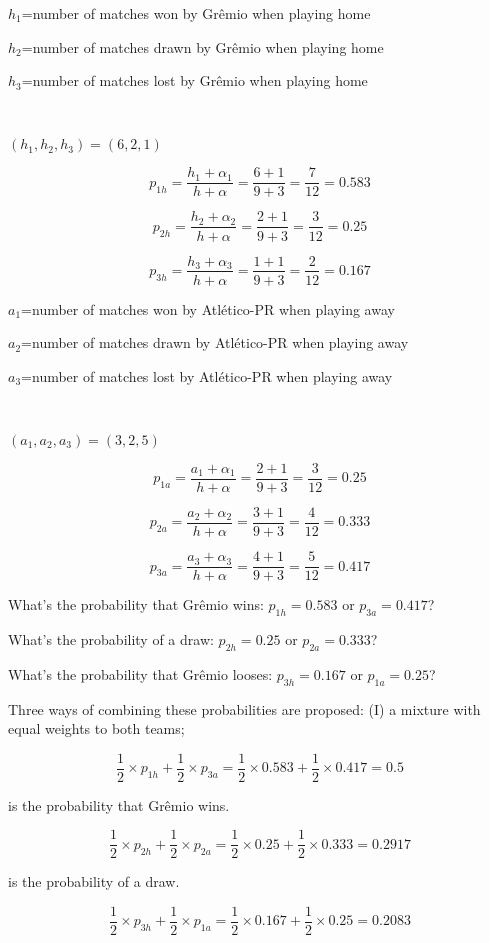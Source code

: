 \documentclass[journal,article,accept,moreauthors,pdftex,12pt,a4paper]{mdpi}
\begin{document}
$h_1$=number of matches won by Gr\^emio when playing home

$h_2$=number of matches drawn by Gr\^emio when playing home

$h_3$=number of matches lost by Gr\^emio when playing home

\

$(h_1,h_2,h_3)=(6,2,1)$


\[
p_{1h}=\frac{h_1+\alpha_1}{h+\alpha}=\frac{6+1}{9+3}=\frac{7}{12}=0.583\]

\[
p_{2h}=\frac{h_2+\alpha_2}{h+\alpha}=\frac{2+1}{9+3}=\frac{3}{12}=0.25\]

\[
p_{3h}=\frac{h_3+\alpha_3}{h+\alpha}=\frac{1+1}{9+3}=\frac{2}{12}=0.167\]


$a_1$=number of matches won by Atl\'etico-PR when playing away

$a_2$=number of matches drawn by Atl\'etico-PR when playing away

$a_3$=number of matches lost by Atl\'etico-PR when playing away

\

$(a_1,a_2,a_3)=(3,2,5)$


\[
p_{1a}=\frac{a_1+\alpha_1}{h+\alpha}=\frac{2+1}{9+3}=\frac{3}{12}=0.25\]

\[
p_{2a}=\frac{a_2+\alpha_2}{h+\alpha}=\frac{3+1}{9+3}=\frac{4}{12}=0.333\]

\[
p_{3a}=\frac{a_3+\alpha_3}{h+\alpha}=\frac{4+1}{9+3}=\frac{5}{12}=0.417\]


What's the probability that Gr\^emio wins: $p_{1h}=0.583$ or $p_{3a}=0.417$?

What's the probability of a draw: $p_{2h}=0.25$ or $p_{2a}=0.333$?

What's the probability that Gr\^emio looses: $p_{3h}=0.167$ or $p_{1a}=0.25$?


Three ways of combining these probabilities are proposed: (I) a mixture with equal weights to both teams; 

\[
\frac{1}{2}\times p_{1h}+\frac{1}{2}\times p_{3a}=\frac{1}{2}\times0.583+\frac{1}{2}\times0.417=0.5
\]

\noindent
is the probability that Gr\^emio wins.


\[
\frac{1}{2}\times p_{2h}+\frac{1}{2}\times p_{2a}=\frac{1}{2}\times0.25+\frac{1}{2}\times0.333=0.2917
\]

\noindent
is the probability of a draw.

\[
\frac{1}{2}\times p_{3h}+\frac{1}{2}\times p_{1a}=\frac{1}{2}\times0.167+\frac{1}{2}\times0.25=0.2083
\]
\end{document}
